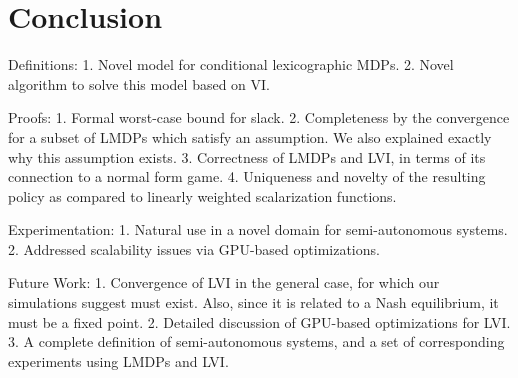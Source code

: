 \section{Conclusion}
\label{sec:conclusion}


Definitions:
1. Novel model for conditional lexicographic MDPs.
2. Novel algorithm to solve this model based on VI.


Proofs:
1. Formal worst-case bound for slack.
2. Completeness by the convergence for a subset of LMDPs which satisfy an assumption. We also explained exactly why this assumption exists.
3. Correctness of LMDPs and LVI, in terms of its connection to a normal form game.
4. Uniqueness and novelty of the resulting policy as compared to linearly weighted scalarization functions.


Experimentation:
1. Natural use in a novel domain for semi-autonomous systems.
2. Addressed scalability issues via GPU-based optimizations.


Future Work:
1. Convergence of LVI in the general case, for which our simulations suggest must exist. Also, since it is related to a Nash equilibrium, it must be a fixed point.
2. Detailed discussion of GPU-based optimizations for LVI.
3. A complete definition of semi-autonomous systems, and a set of corresponding experiments using LMDPs and LVI.

